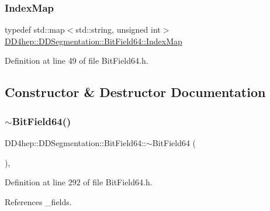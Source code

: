 \subsubsection{\texorpdfstring{Index\+Map}{IndexMap}}
{\footnotesize\ttfamily typedef std\+::map$<$std\+::string, unsigned int$>$ \hyperlink{class_d_d4hep_1_1_d_d_segmentation_1_1_bit_field64_a332cc613098802352470f92c7a7c71fd}{D\+D4hep\+::\+D\+D\+Segmentation\+::\+Bit\+Field64\+::\+Index\+Map}}



Definition at line 49 of file Bit\+Field64.\+h.



\subsection{Constructor \& Destructor Documentation}
\hypertarget{class_d_d4hep_1_1_d_d_segmentation_1_1_bit_field64_a8a82f357f0409ed81727b4de29590b95}{}\label{class_d_d4hep_1_1_d_d_segmentation_1_1_bit_field64_a8a82f357f0409ed81727b4de29590b95} 
\subsubsection{\texorpdfstring{$\sim$\+Bit\+Field64()}{~BitField64()}}
{\footnotesize\ttfamily D\+D4hep\+::\+D\+D\+Segmentation\+::\+Bit\+Field64\+::$\sim$\+Bit\+Field64 (\begin{DoxyParamCaption}{ }\end{DoxyParamCaption})\hspace{0.3cm}{\ttfamily [inline]}, {\ttfamily [virtual]}}



Definition at line 292 of file Bit\+Field64.\+h.



References \+\_\+fields.

\hypertarget{class_d_d4hep_1_1_d_d_segmentation_1_1_bit_field64_aa958402b4d1f8d79cf716397b9b642e4}{}\label{class_d_d4hep_1_1_d_d_segmentation_1_1_bit_field64_aa958402b4d1f8d79cf716397b9b642e4} 
